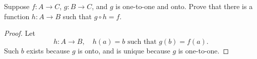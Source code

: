 \begin{tcolorbox}[title=Problem 18, breakable]
    Suppose $f : A \rightarrow C$, $g : B \rightarrow C$, and $g$ is one-to-one and onto.
    Prove that there is a function $h : A \rightarrow B$ such that $g \circ h = f$.
\end{tcolorbox}

\begin{proof}
    Let 
    \[
        h : A \rightarrow B, \quad h(a) = b \text{ such that } g(b) = f(a).
    \]
    Such $b$ exists because $g$ is onto, and is unique because $g$ is one-to-one.
\end{proof}